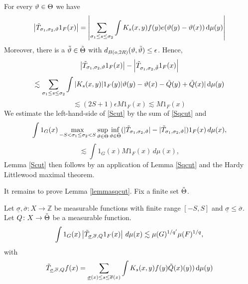 For every $\vartheta\in \Theta$ we have
\begin{equation}
\left| \Tilde{T}_{\sigma_1,\sigma_2,\vartheta} 1_{F}(x)\right|=
\left|\sum_{\sigma_1 \le s\le \sigma_2}
\int K_s(x,y)  f(y) e(\vartheta(y)-{\vartheta(x)}) \, \mathrm{d}\mu(y)\right|
\end{equation}
Moreover, there is a $\tilde{\vartheta}
\in \tilde{\Theta}$ with $d_{B(o,2R)}(\vartheta,\tilde{\vartheta})\le \epsilon$. Hence,
\begin{equation}
    \left| \Tilde{T}_{\sigma_1,\sigma_2,\vartheta} 1_{F}(x)\right|-\left|\Tilde{T}_{\sigma_1,\sigma_2,\tilde{\vartheta}} 1_{F}(x) \right|
\end{equation}
\begin{equation}
  \lesssim
  \sum_{\sigma_1 \le s\le \sigma_2}
\int |K_s(x,y)|  1_F(y) |\vartheta(y)-{\vartheta(x)}
-{\tilde{Q}(y)}+{\tilde{Q}(x)}| \, \mathrm{d}\mu(y)
\end{equation}
\begin{equation}
  \lesssim  (2S+1) \epsilon M1_F(x)\lesssim  M1_F(x)
\end{equation}
We estimate the left-hand-side of \eqref{Scut} by
the sum of \eqref{Sqcut} and
  \begin{equation}
    \int 1_{G}(x)
\max_{-S<\sigma_1\le \sigma_2<S}\sup_{\vartheta\in {\Theta}}
\inf_{\vartheta\in\tilde{\Theta}}
(| \Tilde{T}_{\sigma_1,\sigma_2,\vartheta}|-|\Tilde{T}_{\sigma_1,\sigma_2,\vartheta}  |)1_{F}(x)\, d\mu(x)
,
\end{equation}
\begin{equation}
    \lesssim
     \int 1_{G}(x)
M1_{F}(x)\, d\mu(x)
,
\end{equation}
Lemma \ref{Scut} then follows by an application of Lemma \ref{Sqcut} and
the Hardy Littlewood maximal theorem.


It remains to prove Lemma \ref{lemmasqcut}.
Fix a finite set
$\tilde{\Theta}$.
\begin{lemma}\label{lemmasqlin}
Let $\underline{\sigma},\overline\sigma\colon X\to \mathbb{Z}$ be measurable functions with finite range
$[-S,S]$ and $\underline{\sigma}\leq \overline \sigma$. Let ${Q}\colon X\to {\tilde{\Theta}}$ be a measurable function.
    \begin{equation}  \label{Sqlin}
    \int 1_{G}(x)
\left| \Tilde{T}_{\underline{\sigma},\overline{\sigma},{Q}}1_F(x)
 \right|\, d\mu(x)
\lesssim \mu(G)^{1/q'} \mu(F)^{1/q},
\end{equation}
with
\begin{equation}\label{middles1}
\Tilde{T}_{\underline{\sigma},\overline{\sigma},{Q}}f(x)=\sum_{\underline{\sigma}(x) \le s\le \overline{\sigma}(x)}
\int K_s(x,y)  f(y)\tilde{Q}(x)(y)) \, \mathrm{d}\mu(y)
\end{equation}
\end{lemma}

